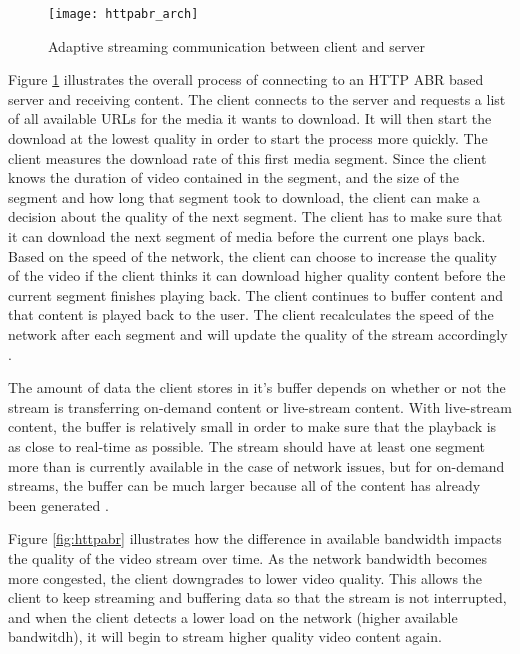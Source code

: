 \documentclass[12pt]{article}
\begin{document}
\begin{figure}[htbp]
  \begin{center}
    \texttt{[image: httpabr\_arch]}
    \caption{Adaptive streaming communication between client and server}
    \label{fig:httpabr_arch}
  \end{center}
\end{figure}

Figure \ref{fig:httpabr_arch} illustrates the overall process of connecting to an HTTP ABR based server and receiving content.  The client connects to the server and requests a list of all available URLs for the media it wants to download.  It will then start the download at the lowest quality in order to start the process more quickly.  The client measures the download rate of this first media segment. Since the client knows the duration of video contained in the segment, and the size of the segment and how long that segment took to download, the client can make a decision about the quality of the next segment. The client has to make sure that it can download the next segment of media before the current one plays back.  Based on the speed of the network, the client can choose to increase the quality of the video if the client thinks it can download higher quality content before the current segment finishes playing back. The client continues to buffer content and that content is played back to the user.  The client recalculates the speed of the network after each segment and will update the quality of the stream accordingly \cite{5986186}.


The amount of data the client stores in it's buffer depends on whether or not the stream is transferring on-demand content or live-stream content.  With live-stream content, the buffer is relatively small in order to make sure that the playback is as close to real-time as possible.  The stream should have at least one segment more than is currently available in the case of network issues, but for on-demand streams, the buffer can be much larger because all of the content has already been generated \cite{5986186}.

Figure \ref{fig:httpabr} illustrates how the difference in available bandwidth impacts the quality of the video stream over time.  As the network bandwidth becomes more congested, the client downgrades to lower video quality.  This allows the client to keep streaming and buffering data so that the stream is not interrupted, and when the client detects a lower load on the network (higher available bandwitdh), it will begin to stream higher quality video content again.
\end{document}
